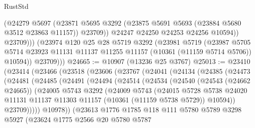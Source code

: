 \begin{lexlean}{RustStd}
\begin{coremodule}
                  (@24279
                    @5697
                    (@23871
                      @5695
                      @3292
                      (@23875 @5691 @5693 (@23884 @5680 @3512 @23863 @11157))
                      @23709))
                  @24247
                  @24250
                  @24253
                  @24256
                  @10594))
              @23709)))
        (@23974
          @120
          @25
          @28
          @5719
          @3292
          (@23981
            @5719
            (@23987
              @5705
              @5714
              @23923
              @11131
              @11137
              @11255
              @11157
              (@10361 (@11159 @5714 @5706))
              @10594))
          @23709)))
@24665 := @10907 (@13236 @25 @3767)
@25013 := @23410
    (@23414
      (@23466
        (@23518
          (@23606
            (@23767
              (@24041
                (@24134
                  (@24385
                    (@24473
                      (@24481
                        (@24485
                          (@24491
                            (@24494
                              (@24514
                                (@24534
                                  (@24540
                                    (@24543 (@24662 @24665))
                                    (@24005
                                      @5743
                                      @3292
                                      (@24009
                                        @5743
                                        (@24015
                                          @5728
                                          @5738
                                          @24020
                                          @11131
                                          @11137
                                          @11303
                                          @11157
                                          (@10361 (@11159 @5738 @5729))
                                          @10594))
                                      @23709)))))
                            @10978))
                        (@23613
                          @1776
                          @1785
                          @118
                          @111
                          @5780
                          @5789
                          @3298
                          @5927
                          (@23624
                            @1775
                            @2566
                            @20
                            @5780
                            @5787

\end{coremodule}
\end{lexlean}
